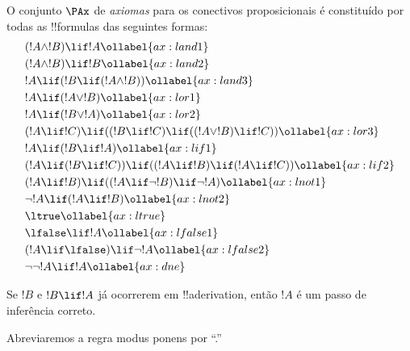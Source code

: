 \documentclass[../../../include/open-logic-section]{subfiles}
\begin{document}
      {}
      {}


\begin{defn}[Axiomas]
O conjunto $\PAx$ de \emph{axiomas} para os conectivos proposicionais é constituído
por todas as !!{formula}s das seguintes formas:
\begin{align}
  & (!A \land !B) \lif !A \ollabel{ax:land1}\\
  & (!A \land !B) \lif !B \ollabel{ax:land2}\\
  & !A \lif (!B \lif (!A \land !B)) \ollabel{ax:land3}\\
  & !A \lif (!A \lor !B) \ollabel{ax:lor1}\\
  & !A \lif (!B \lor !A) \ollabel{ax:lor2}\\
  & (!A \lif !C) \lif ((!B \lif !C) \lif ((!A \lor !B) \lif !C)) \ollabel{ax:lor3}\\
  & !A \lif (!B \lif !A) \ollabel{ax:lif1}\\
  & (!A \lif (!B \lif !C)) \lif ((!A \lif !B) \lif (!A \lif !C)) \ollabel{ax:lif2}\\
  & (!A \lif !B) \lif ((!A \lif \lnot !B) \lif \lnot !A) \ollabel{ax:lnot1}\\
  & \lnot !A \lif (!A \lif !B) \ollabel{ax:lnot2}\\
  & \ltrue \ollabel{ax:ltrue}\\
  & \lfalse \lif !A \ollabel{ax:lfalse1}\\
  & (!A \lif \lfalse) \lif \lnot !A \ollabel{ax:lfalse2}\\
  & \lnot\lnot !A \lif !A \ollabel{ax:dne}
\end{align}
\end{defn}

\begin{defn}
  Se $!B$ e $!B \lif !A$ já ocorrerem em !!a{derivation}, então $!A$ é
  um passo de inferência correto.
\end{defn}

Abreviaremos a regra modus ponens por ``\MP.''
\end{document}
